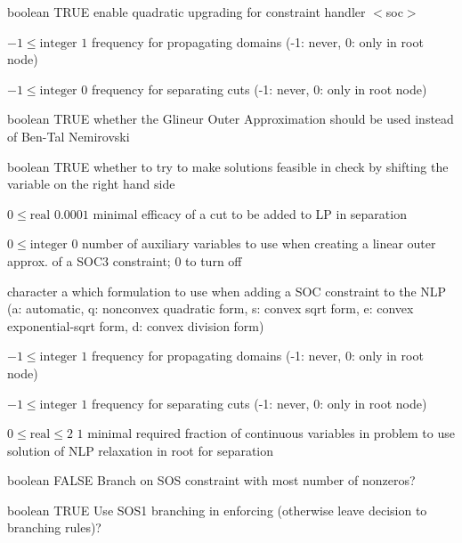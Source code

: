 %
{boolean}%
{TRUE}%
{enable quadratic upgrading for constraint handler $<$soc$>$}%
{}

%
{$-1\leq\textrm{integer}$}%
{$1$}%
{frequency for propagating domains (-1: never, 0: only in root node)}%
{}

%
{$-1\leq\textrm{integer}$}%
{$0$}%
{frequency for separating cuts (-1: never, 0: only in root node)}%
{}

%
{boolean}%
{TRUE}%
{whether the Glineur Outer Approximation should be used instead of Ben-Tal Nemirovski}%
{}

%
{boolean}%
{TRUE}%
{whether to try to make solutions feasible in check by shifting the variable on the right hand side}%
{}

%
{$0\leq\textrm{real}$}%
{$0.0001$}%
{minimal efficacy of a cut to be added to LP in separation}%
{}

%
{$0\leq\textrm{integer}$}%
{$0$}%
{number of auxiliary variables to use when creating a linear outer approx. of a SOC3 constraint; 0 to turn off}%
{}

%
{character}%
{a}%
{which formulation to use when adding a SOC constraint to the NLP (a: automatic, q: nonconvex quadratic form, s: convex sqrt form, e: convex exponential-sqrt form, d: convex division form)}%
{}

%
{$-1\leq\textrm{integer}$}%
{$1$}%
{frequency for propagating domains (-1: never, 0: only in root node)}%
{}

%
{$-1\leq\textrm{integer}$}%
{$1$}%
{frequency for separating cuts (-1: never, 0: only in root node)}%
{}

%
{$0\leq\textrm{real}\leq2$}%
{$1$}%
{minimal required fraction of continuous variables in problem to use solution of NLP relaxation in root for separation}%
{}

%
{boolean}%
{FALSE}%
{Branch on SOS constraint with most number of nonzeros?}%
{}

%
{boolean}%
{TRUE}%
{Use SOS1 branching in enforcing (otherwise leave decision to branching rules)?}%
{}

